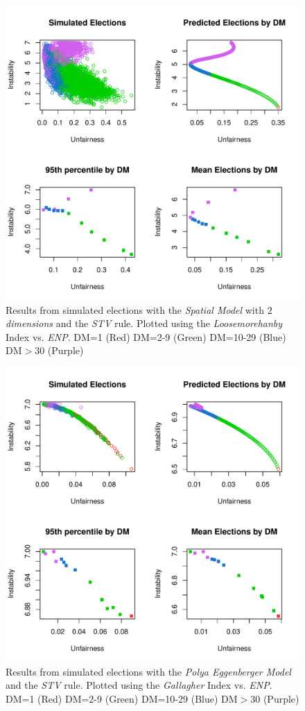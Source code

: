 \documentclass{article}
\begin{document}
\begin{figure}[]
\includegraphics[scale=1.00]{images/stv_spatial2_loosemorehanby_enp.pdf}
\caption{Results from simulated elections with the \emph{Spatial Model} with \emph{$2$ dimensions} and the \emph{STV} rule. Plotted using the \emph{Loosemorehanby} Index vs. \emph{ENP}. DM=1 (Red) DM=2-9 (Green) DM=10-29 (Blue) DM$>$30 (Purple)}
\label{fig:stv_spatial2_loosemorehanby}
\end{figure}

\begin{figure}[]
\includegraphics[scale=1.00]{images/stv_urn_gallagher_enp.pdf}
\caption{Results from simulated elections with the \emph{Polya Eggenberger Model} and the \emph{STV} rule. Plotted using the \emph{Gallagher} Index vs. \emph{ENP}. DM=1 (Red) DM=2-9 (Green) DM=10-29 (Blue) DM$>$30 (Purple)}
\label{fig:stv_urn}
\end{figure}
\end{document}
